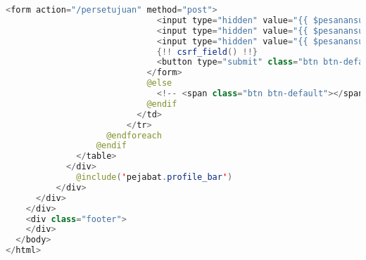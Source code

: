 \begin{lstlisting}[language=Java,basicstyle=\tiny,caption=\textit{Home} pejabat]
                            <form action="/persetujuan" method="post">
                              <input type="hidden" value="{{ $pesanansurat->formatsurat_id }}" name="idFormatSurat">
                              <input type="hidden" value="{{ $pesanansurat->dataSurat }}" name="dataSurat">
                              <input type="hidden" value="{{ $pesanansurat->id }}" name="idPesananSurat">
                              {!! csrf_field() !!}
                              <button type="submit" class="btn btn-default">Tambah<br>Persetujuan</button>
                            </form>
                            @else
                              <!-- <span class="btn btn-default"></span> -->
                            @endif
                          </td>
                        </tr>
                    @endforeach
                  @endif
              </table>
            </div>
              @include('pejabat.profile_bar')
          </div>
      </div>
    </div>
    <div class="footer">
    </div>
  </body>
</html>

\end{lstlisting}

